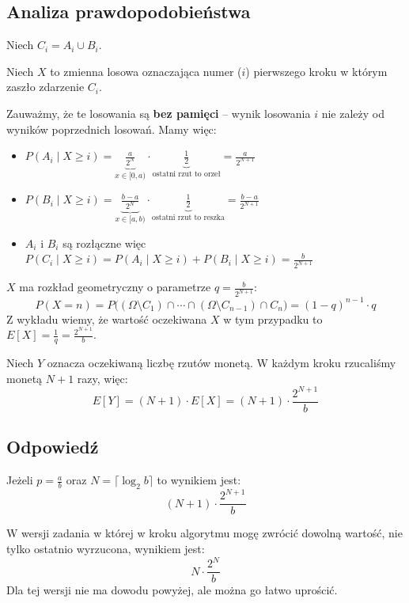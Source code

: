 \subsection*{Analiza prawdopodobieństwa}
Niech \(C_i = A_i \cup B_i\).

Niech \(X\) to zmienna losowa oznaczająca numer (\(i\)) pierwszego kroku w którym zaszło
zdarzenie \(C_i\).

Zauważmy, że te losowania są \textbf{bez pamięci} -- wynik losowania \(i\)
nie zależy od wyników poprzednich losowań. Mamy więc:
\begin{itemize}
	\item \(
	      P(A_i \mid X \geq i)
	      = \underbrace{\frac{a}{2^N}}_{x \in [0, a)}
	      \cdot \underbrace{\frac{1}{2}}_{\text{ostatni rzut to orzeł}}
	      = \frac{a}{2^{N+1}}
	      \)
	\item \(
	      P(B_i \mid X \geq i)
	      = \underbrace{\frac{b-a}{2^N}}_{x \in [a, b)}
	      \cdot \underbrace{\frac{1}{2}}_{\text{ostatni rzut to reszka}}
	      = \frac{b-a}{2^{N+1}}
	      \)
	\item \(A_i\) i \(B_i\) są rozłączne więc \(
	      P(C_i \mid X \geq i)
	      = P(A_i \mid X \geq i) + P(B_i \mid X \geq i)
	      = \frac{b}{2^{N+1}}
	      \)
\end{itemize}

\(X\) ma rozkład geometryczny o parametrze \(q = \frac{b}{2^{N+1}}\):
\[
	P(X = n) = P\Bigg( (\Omega \setminus C_1) \cap \cdots \cap (\Omega \setminus C_{n-1}) \cap C_n \Bigg)
	= (1-q)^{n-1} \cdot q
\]
Z wykładu wiemy, że wartość oczekiwana \(X\) w tym przypadku to \(E[X] = \frac{1}{q} = \frac{2^{N+1}}{b}\).

Niech \(Y\) oznacza oczekiwaną liczbę rzutów monetą.
W każdym kroku rzucaliśmy monetą \(N+1\) razy, więc:
\[
	E[Y] = (N+1) \cdot E[X] = (N+1) \cdot \frac{2^{N+1}}{b}
\]

\subsection*{Odpowiedź}
Jeżeli \(p = \frac{a}{b}\) oraz \(N = \lceil \log_2 b \rceil\) to wynikiem jest:
\[
	\boxed{(N+1) \cdot \frac{2^{N+1}}{b}}
\]

W wersji zadania w której w kroku algorytmu mogę zwrócić dowolną wartość,
nie tylko ostatnio wyrzucona, wynikiem jest:
\[
	\boxed{N \cdot \frac{2^N}{b}}
\]
Dla tej wersji nie ma dowodu powyżej, ale można go łatwo uprościć.
